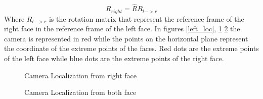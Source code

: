 \documentclass[11pt, oneside]{article}   	%
\begin{document}
$$
R_{right} = \hat{R}R_{l->r}
$$
Where $R_{l->r}$ is the rotation matrix that represent the reference frame of the right face in the reference frame of the left face.
In figures \ref{left_loc}, \ref{right_loc} \ref{general_loc} the camera is represented in red while the points on the horizontal plane represent the coordinate of the extreme points of the faces. Red dots are the extreme points of the left face while blue dots are the extreme points of the right face. 

\begin{figure}
 \centering
    \qquad
    \caption{Camera Localization from right face}%
    \label{right_loc}%
\end{figure}

\begin{figure}
 \centering
    \qquad
    \caption{Camera Localization from both face}%
    \label{general_loc}%
\end{figure}
\end{document}
